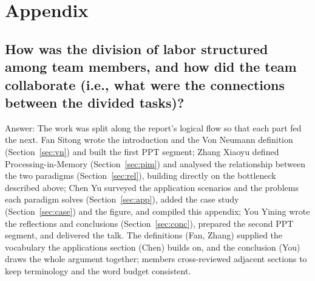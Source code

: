 \documentclass{article} %
\begin{document}



\appendix
\section{Appendix}

\subsection*{How was the division of labor structured among team members, and how did the team collaborate (i.e., what were the connections between the divided tasks)?}
Answer: The work was split along the report's logical flow so that each part
fed the next. Fan Sitong wrote the introduction and the Von Neumann definition
(Section~\ref{sec:vn}) and built the first PPT segment; Zhang Xiaoyu defined
Processing-in-Memory (Section~\ref{sec:pim}) and analysed the relationship
between the two paradigms (Section~\ref{sec:rel}), building directly on the
bottleneck described above; Chen Yu surveyed the application scenarios and the
problems each paradigm solves (Section~\ref{sec:app}), added the case study
(Section~\ref{sec:case}) and the figure, and compiled this appendix;
You Yining wrote the reflections and conclusions (Section~\ref{sec:conc}),
prepared the second PPT segment, and delivered the talk. The definitions
(Fan, Zhang) supplied the vocabulary the applications section (Chen) builds on,
and the conclusion (You) draws the whole argument together; members
cross-reviewed adjacent sections to keep terminology and the word budget
consistent.
\end{document}
